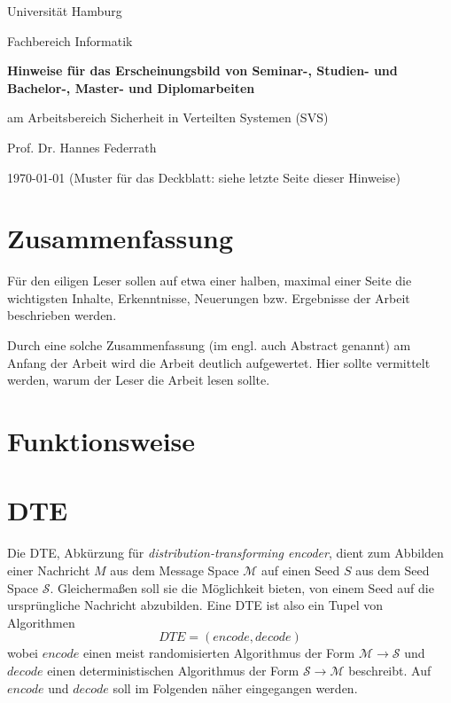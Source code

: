 \documentclass[12pt]{scrartcl}
\begin{document}
\newpage
\thispagestyle{empty}
\begin{center}\Large
Universität Hamburg \par
Fachbereich Informatik
\vfill
{\Large\textsf{\textbf{Hinweise für das Erscheinungsbild von Seminar-, Studien- und Bachelor-, Master- und Diplomarbeiten}}\par} 
\bigskip
am Arbeitsbereich Sicherheit in Verteilten Systemen (SVS) \par
\bigskip
Prof. Dr. Hannes Federrath \par
\bigskip
\today
\vfill
\vfill 
(Muster für das Deckblatt: siehe letzte Seite dieser Hinweise)
\end{center}

\newpage
\section*{Zusammenfassung}

Für den eiligen Leser sollen auf etwa einer halben, maximal einer Seite die wichtigsten Inhalte, Erkenntnisse, Neuerungen bzw. Ergebnisse der Arbeit beschrieben werden. 

Durch eine solche Zusammenfassung (im engl. auch Abstract genannt) am Anfang der Arbeit wird die Arbeit deutlich aufgewertet. Hier sollte vermittelt werden, warum der Leser die Arbeit lesen sollte.

\newpage
\tableofcontents

\section{Funktionsweise}
\label{sec:funktionsweise}

\newpage
\section{DTE}
\label{sec:dte}
Die DTE, Abkürzung für \emph{distribution-transforming encoder}, dient zum Abbilden einer Nachricht $M$ aus dem Message Space $\mathcal{M}$ auf einen Seed $S$ aus dem Seed Space $\mathcal{S}$. Gleichermaßen soll sie die Möglichkeit bieten, von einem Seed auf die ursprüngliche Nachricht abzubilden. Eine DTE ist also ein Tupel von Algorithmen
$$DTE = (encode, decode)$$
wobei $encode$ einen meist randomisierten Algorithmus der Form $\mathcal{M} \rightarrow \mathcal{S}$ und $decode$ einen deterministischen Algorithmus der Form $\mathcal{S} \rightarrow \mathcal{M}$ beschreibt. Auf $encode$ und $decode$ soll im Folgenden näher eingegangen werden.
\end{document}
